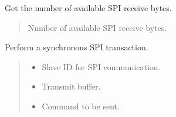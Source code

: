 \documentclass[letterpaper,10pt,english]{sphinxmanual}
\begin{document}
\begin{fulllineitems}
\begin{fulllineitems}
\begin{quote}
\begin{description}
\end{description}\end{quote}

\end{fulllineitems}


\begin{fulllineitems}
\label{\detokenize{cplddocs:management_flash.MngProgFlash.spi_rx_available}}
\pysigstartsignatures
{}
\pysigstopsignatures
\sphinxAtStartPar
Get the number of available SPI receive bytes.
\begin{quote}\begin{description}
\sphinxAtStartPar
Number of available SPI receive bytes.

\end{description}\end{quote}

\end{fulllineitems}


\begin{fulllineitems}
\label{\detokenize{cplddocs:management_flash.MngProgFlash.spi_sync}}
\pysigstartsignatures
{}
\pysigstopsignatures
\sphinxAtStartPar
Perform a synchronous SPI transaction.
\begin{quote}\begin{description}
\begin{itemize}
\item {} 
\sphinxAtStartPar
{} \textendash{} Slave ID for SPI communication.

\item {} 
\sphinxAtStartPar
{} \textendash{} Transmit buffer.

\item {} 
\sphinxAtStartPar
{} \textendash{} Command to be sent.


\end{itemize}
\end{description}
\end{quote}
\end{fulllineitems}
\end{fulllineitems}
\end{document}
